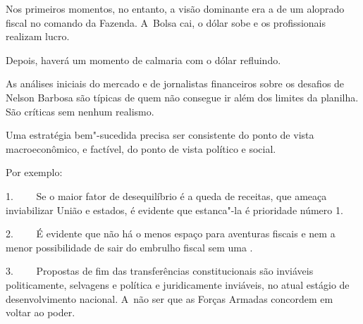 Nos primeiros momentos, no entanto, a visão dominante era a de um
aloprado fiscal no comando da Fazenda. A~Bolsa cai, o dólar sobe e os
profissionais realizam lucro.

Depois, haverá um momento de calmaria com o dólar refluindo.

\asterisc{}

As análises iniciais do mercado e de jornalistas financeiros sobre os
desafios de Nelson Barbosa são típicas de quem não consegue ir além dos
limites da planilha. São críticas sem nenhum realismo.

Uma estratégia bem"-sucedida precisa ser consistente do ponto de vista
macroeconômico, e factível, do ponto de vista político e social.

Por exemplo:

1.~~~~ Se o maior fator de desequilíbrio é a queda de receitas, que
ameaça inviabilizar União e estados, é evidente que estanca"-la é
prioridade número 1.

2.~~~~ É evidente que não há o menos espaço para aventuras fiscais e nem
a menor possibilidade de sair do embrulho fiscal sem uma .

3.~~~~ Propostas de fim das transferências constitucionais são inviáveis
politicamente, selvagens e política e juridicamente inviáveis, no atual
estágio de desenvolvimento nacional. A~não ser que as Forças Armadas
concordem em voltar ao poder.~
